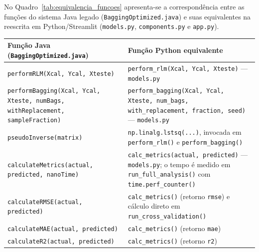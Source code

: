 
No Quadro~\ref{tab:equivalencia_funcoes} apresenta-se a correspondência entre as funções do sistema Java legado (\texttt{BaggingOptimized.java}) e suas equivalentes na reescrita em Python/Streamlit (\texttt{models.py}, \texttt{components.py} e \texttt{app.py}).

\begin{quadro}[ht]
\begin{center}
\footnotesize
\captionsetup{justification=centering, labelsep=endash, width=0.75\linewidth}
\caption{Equivalência entre as funções do sistema Java legado e do sistema Python.}
\label{tab:equivalencia_funcoes}
\begin{threeparttable}
\renewcommand{\arraystretch}{1.15}
\begin{tabularx}{\textwidth}{|>{\raggedright\arraybackslash}X|>{\raggedright\arraybackslash}X|}
\hline
\textbf{Função Java (\texttt{BaggingOptimized.java})} & \textbf{Função Python equivalente} \\ \hline
\texttt{performRLM(Xcal, Ycal, Xteste)} & \texttt{perform\_rlm(Xcal, Ycal, Xteste)} --- \texttt{models.py} \\ \hline
\texttt{performBagging(Xcal, Ycal, Xteste, numBags, withReplacement, sampleFraction)} & \texttt{perform\_bagging(Xcal, Ycal, Xteste, num\_bags, with\_replacement, fraction, seed)} --- \texttt{models.py} \\ \hline
\texttt{pseudoInverse(matrix)} & \texttt{np.linalg.lstsq(...)}, invocada em \texttt{perform\_rlm()} e \texttt{perform\_bagging()} \\ \hline
\texttt{calculateMetrics(actual, predicted, nanoTime)} & \texttt{calc\_metrics(actual, predicted)} --- \texttt{models.py}; o tempo é medido em \texttt{run\_full\_analysis()} com \texttt{time.perf\_counter()} \\ \hline
\texttt{calculateRMSE(actual, predicted)} & \texttt{calc\_metrics()} (retorno \texttt{rmse}) e cálculo direto em \texttt{run\_cross\_validation()} \\ \hline
\texttt{calculateMAE(actual, predicted)} & \texttt{calc\_metrics()} (retorno \texttt{mae}) \\ \hline
\texttt{calculateR2(actual, predicted)} & \texttt{calc\_metrics()} (retorno \texttt{r2}) \\ \hline

\end{tabularx}
\end{threeparttable}
\end{center}
\end{quadro}
